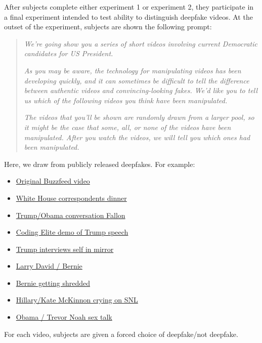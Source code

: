 After subjects complete either experiment 1 or experiment 2, they
participate in a final experiment intended to test ability to
distinguish deepfake videos. At the outset of the experiment, subjects
are shown the following prompt:

\begin{quotation}
\emph{We're going show you a series of short videos involving current Democratic candidates for US President.}

\emph{As you may be aware, the technology for manipulating videos has been developing quickly, and it can sometimes be difficult to tell the difference between authentic videos and convincing-looking fakes. We'd like you to tell us which of the following videos you think have been manipulated.}

\emph{The videos that you'll be shown are randomly drawn from a larger pool, so it might be the case that some, all, or none of the videos have been manipulated. After you watch the videos, we will tell you which ones had been manipulated.}
\end{quotation}  

Here, we draw from publicly released deepfakes. For example:

\begin{itemize}
  \item \href{https://www.youtube.com/watch?v=cQ54GDm1eL0}{Original Buzzfeed video}
  \item \href{https://www.youtube.com/watch?v=s34NWArsxVw}{White House correspondents dinner} 
  \item \href{https://youtu.be/rvF5IA7HNKc?t=15}{Trump/Obama conversation Fallon}
  \item \href{https://www.youtube.com/watch?v=8PowkVIQI0E}{Coding Elite demo of Trump speech}
  \item \href{https://www.youtube.com/watch?v=J2yNZ0s9snU}{Trump interviews self in mirror}
  \item \href{https://www.youtube.com/watch?v=f0lFtwlG4N4}{Larry David / Bernie}
  \item \href{https://www.youtube.com/watch?v=Pe0nEej6l28}{Bernie getting shredded}
  \item \href{https://www.youtube.com/watch?v=RWZmLKw7PG8}{Hillary/Kate McKinnon crying on SNL}
  \item \href{https://youtu.be/nIU_DvjICnY?t=18}{Obama / Trevor Noah sex talk}
\end{itemize}

For each video, subjects are given a forced choice of deepfake/not deepfake.
